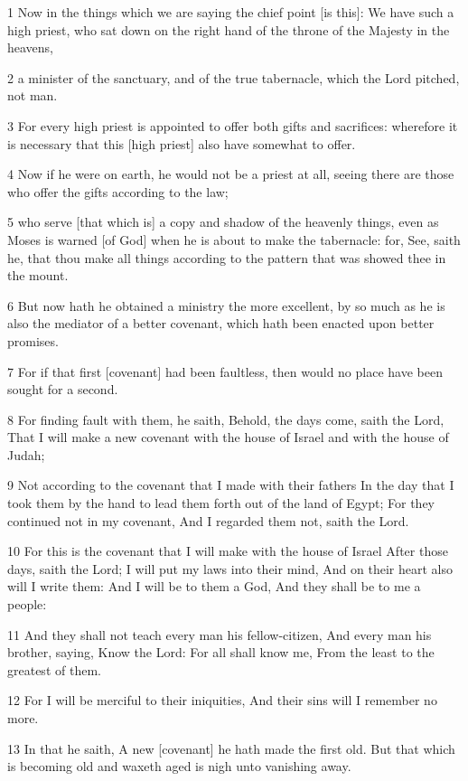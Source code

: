 \par 1 Now in the things which we are saying the chief point [is this]: We have such a high priest, who sat down on the right hand of the throne of the Majesty in the heavens,
\par 2 a minister of the sanctuary, and of the true tabernacle, which the Lord pitched, not man.
\par 3 For every high priest is appointed to offer both gifts and sacrifices: wherefore it is necessary that this [high priest] also have somewhat to offer.
\par 4 Now if he were on earth, he would not be a priest at all, seeing there are those who offer the gifts according to the law;
\par 5 who serve [that which is] a copy and shadow of the heavenly things, even as Moses is warned [of God] when he is about to make the tabernacle: for, See, saith he, that thou make all things according to the pattern that was showed thee in the mount.
\par 6 But now hath he obtained a ministry the more excellent, by so much as he is also the mediator of a better covenant, which hath been enacted upon better promises.
\par 7 For if that first [covenant] had been faultless, then would no place have been sought for a second.
\par 8 For finding fault with them, he saith, Behold, the days come, saith the Lord, That I will make a new covenant with the house of Israel and with the house of Judah;
\par 9 Not according to the covenant that I made with their fathers In the day that I took them by the hand to lead them forth out of the land of Egypt; For they continued not in my covenant, And I regarded them not, saith the Lord.
\par 10 For this is the covenant that I will make with the house of Israel After those days, saith the Lord; I will put my laws into their mind, And on their heart also will I write them: And I will be to them a God, And they shall be to me a people:
\par 11 And they shall not teach every man his fellow-citizen, And every man his brother, saying, Know the Lord: For all shall know me, From the least to the greatest of them.
\par 12 For I will be merciful to their iniquities, And their sins will I remember no more.
\par 13 In that he saith, A new [covenant] he hath made the first old. But that which is becoming old and waxeth aged is nigh unto vanishing away.

